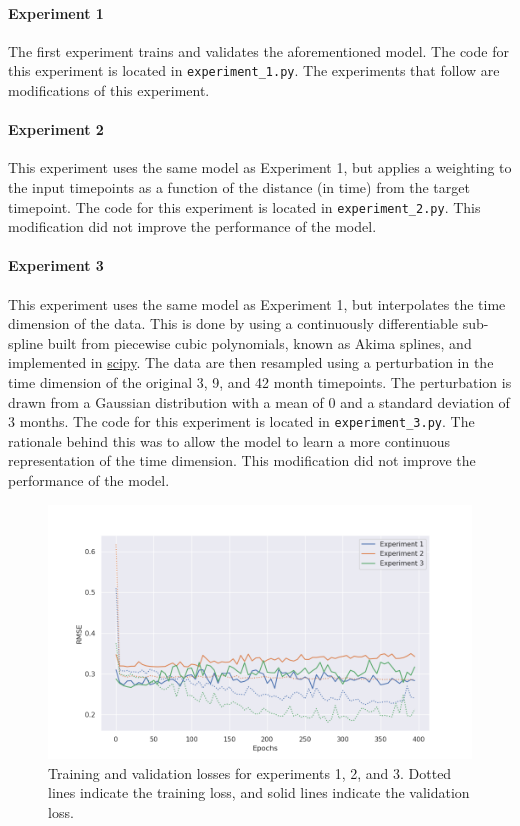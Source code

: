 \documentclass[twocolumn, 9pt]{extarticle}
\begin{document}
\paragraph{Experiment 1} The first experiment trains and validates the aforementioned model. The code for this experiment is located in \texttt{experiment\_1.py}. The experiments that follow are modifications of this experiment.

\paragraph{Experiment 2} This experiment uses the same model as Experiment 1, but applies a weighting to the input timepoints as a function of the distance (in time) from the target timepoint. The code for this experiment is located in \texttt{experiment\_2.py}. This modification did not improve the performance of the model.

\paragraph{Experiment 3} This experiment uses the same model as Experiment 1, but interpolates the time dimension of the data. This is done by using a continuously differentiable sub-spline built from piecewise cubic polynomials, known as Akima splines, and implemented in \href{https://docs.scipy.org/doc/scipy/reference/generated/scipy.interpolate.Akima1DInterpolator.html\#scipy.interpolate.Akima1DInterpolator}{scipy}. The data are then resampled using a perturbation in the time dimension of the original 3, 9, and 42 month timepoints. The perturbation is drawn from a Gaussian distribution with a mean of 0 and a standard deviation of 3 months. The code for this experiment is located in \texttt{experiment\_3.py}. The rationale behind this was to allow the model to learn a more continuous representation of the time dimension. This modification did not improve the performance of the model.

\begin{figure}
  \centering
  \includegraphics[width=\columnwidth]{cnn_autoencoder_experiments_1_to_3.png}
  \caption{Training and validation losses for experiments 1, 2, and 3. Dotted lines indicate the training loss, and solid lines indicate the validation loss.}
  \label{fig:losses_cnn}
\end{figure}
\end{document}
